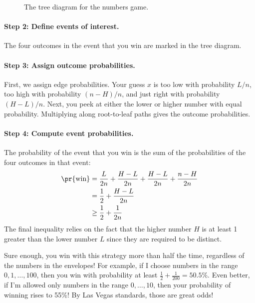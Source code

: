 \begin{figure}[h]


\caption{The tree diagram for the numbers game.}

\label{fig:16F4}

\end{figure}

\paragraph{Step 2: Define events of interest.}

The four outcomes in the event that you win are marked in the tree
diagram.

\paragraph{Step 3: Assign outcome probabilities.}

First, we assign edge probabilities.  Your guess $x$ is too low with
probability $L/n$, too high with probability $(n-H)/n$, and just right
with probability $(H-L)/n$.  Next, you peek at either the lower or
higher number with equal probability.  Multiplying along root-to-leaf
paths gives the outcome probabilities.

\paragraph{Step 4: Compute event probabilities.}

The probability of the event that you win is the sum of the
probabilities of the four outcomes in that event:
%
\begin{align*}
\pr{\text{win}}
    & = \frac{L}{2n} + \frac{H-L}{2n} + \frac{H-L}{2n}  + \frac{n-H}{2n} \\
    & = \frac{1}{2} + \frac{H-L}{2n} \\
    & \geq \frac{1}{2} + \frac{1}{2n}
\end{align*}
%
The final inequality relies on the fact that the higher number $H$ is
at least 1 greater than the lower number $L$ since they are required
to be distinct.

Sure enough, you win with this strategy more than half the time,
regardless of the numbers in the envelopes!  For example, if I choose
numbers in the range $0, 1, \dots, 100$, then you win with probability at
least $\frac{1}{2} + \frac{1}{200} = 50.5\%$.  Even better, if I'm allowed
only numbers in the range $0, \dots, 10$, then your probability of
winning rises to 55\%!  By Las Vegas standards, those are great odds!

